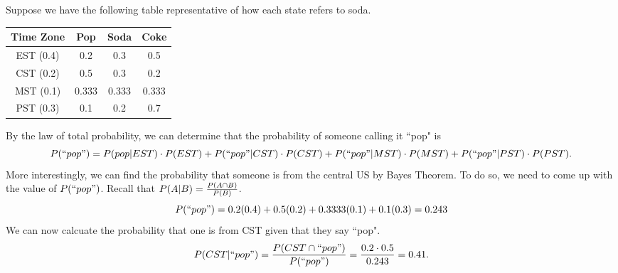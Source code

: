 \documentclass{hw}
\begin{document}
Suppose we have the following table representative of how each state refers to soda.

\begin{center}
\begin{tabular}{|c|c|c|c|}
\hline
Time Zone & Pop & Soda & Coke\\
\hline
EST (0.4) & 0.2 & 0.3 & 0.5\\
\hline
CST (0.2) & 0.5 & 0.3 & 0.2\\
\hline
MST (0.1) & 0.333 & 0.333 & 0.333\\
\hline
PST (0.3) & 0.1 & 0.2 & 0.7\\
\hline
\end{tabular}
\end{center}

By the law of total probability, we can determine that the probability of someone calling it ``pop"
is
\[
P(``pop")=P(pop|EST)\cdot P(EST) + P(``pop"|CST)\cdot P(CST) +
P(``pop"|MST)\cdot P(MST) + P(``pop"|PST)\cdot P(PST).
\]
More interestingly, we can find the probability that someone is from the central US by Bayes Theorem.
To do so, we need to come up with the value of $P(``pop")$. Recall that
$P(A|B)={P(A\cap B)\over P(B)}$.
\[
P(``pop") = 0.2(0.4) + 0.5(0.2) + 0.3333(0.1) + 0.1(0.3) = 0.243
\]
We can now calcuate the probability that one is from CST given that they say ``pop".
\[
P(CST|``pop")={P(CST\cap``pop")\over P(``pop")}={0.2\cdot 0.5\over 0.243} = 0.41.
\]
\end{document}
